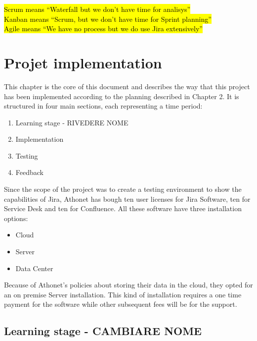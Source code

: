 \begin{savequote}[90mm]
	\hl{Scrum means ``Waterfall but we don't have time for analisys''\\
	Kanban means ``Scrum, but we don't have time for Sprint planning''\\
	Agile means ``We have no process but we do use Jira extensively''
	}
\end{savequote}

\chapter{Projet implementation}
	This chapter is the core of this document and describes the way that this project has been implemented according to the planning described in Chapter 2.
	It is structured in four main sections, each representing a time period:
	\begin{enumerate}
		\item Learning stage - RIVEDERE NOME
		\item Implementation
		\item Testing
		\item Feedback
	\end{enumerate}
	Since the scope of the project was to create a testing environment to show the capabilities of Jira, Athonet has bough ten user licenses for Jira Software, ten for Service Desk and ten for Confluence.
	All these software have three installation options:
	\begin{itemize}
		\item Cloud
		\item Server
		\item Data Center
	\end{itemize}
	Because of Athonet's policies about storing their data in the cloud, they opted for an on premise Server installation.
	This kind of installation requires a one time payment for the software while other subsequent fees will be for the support.

\section{Learning stage - CAMBIARE NOME}


